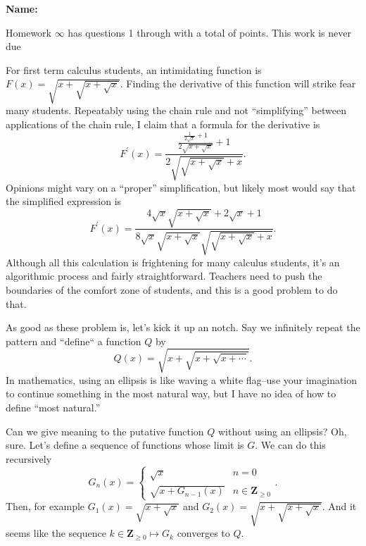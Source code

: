 \documentclass[12pt,fleqn,answers]{exam}
\newcommand{\integers}{\mathbf{Z}}
\newcommand{\quiz}{$\infty$}
\newcommand{\term}{Fall}
\begin{document}
\vspace{0.1in}
\noindent{}
{\bf Name:}  \\
\noindent \makebox[3.0truein][l]{\textbf{Homework \quiz, \term \/ \the\year}}
\vspace{0.1in}

\noindent  Homework \quiz\/  has questions 1 through  \numquestions \/ with a total 
of  \numpoints\/  points. 
This work is never due


\begin{questions}

 \question For first term calculus students, an intimidating function is $F(x) = \sqrt{x + \sqrt{x + \sqrt{x}}}$. Finding the derivative of 
 this function will strike fear many students. Repeatably using the chain rule and not ``simplifying'' between applications of the chain rule, 
  I claim that a formula for the derivative is
\begin{equation*}
F^\prime(x) = \frac{\frac{\frac{1}{2 \sqrt{x}}+1}{2 \sqrt{x+\sqrt{x}}}+1}{2 \sqrt{\sqrt{x+\sqrt{x}}+x}}.
\end{equation*}
Opinions might vary on a ``proper'' simplification, but likely most would say that the simplified expression is
\begin{equation*}
F^\prime(x) = \frac{4 \sqrt{x} \sqrt{x+\sqrt{x}}+2 \sqrt{x}+1}{8 \sqrt{x} \sqrt{x+\sqrt{x}} \sqrt{\sqrt{x+\sqrt{x}}+x}}.
  \end{equation*}
  Although all this calculation is frightening for many calculus students, it's an algorithmic process and fairly straightforward.  Teachers need to push
  the boundaries of the comfort zone of students, and this is a good problem to do that.
  
  
  \quad As good as these problem is, let's kick it up an notch.  Say we infinitely repeat the pattern and ``define`` a function $Q$ by
  \begin{equation*}
 Q(x) = \sqrt{x + \sqrt{x + \sqrt{x + \cdots}}}.
\end{equation*}
In mathematics, using an ellipsis is like waving a white flag--use your imagination to continue something in the most natural way, 
but I have no idea of how to define ``most natural.''  

\quad Can we give meaning to the putative function $Q$ without using an ellipsis?  Oh, sure.  Let's define a sequence of functions whose limit
is $G$.  We can do this recursively
\begin{equation*}
   G_{n}(x) = \begin{cases}  \sqrt{x}  & n = 0 \\ \sqrt{x + G_{n-1}(x)}  & n \in \integers_{\geq 0} \end{cases}.
\end{equation*}
Then, for example $G_1(x) = \sqrt{x+\sqrt{x}}$ and $G_2(x) = \sqrt{x+\sqrt{x + \sqrt{x}}}$.   And it seems like
the sequence $k \in \integers_{\geq 0} \mapsto G_k$ converges to $Q$.


\end{questions}
\end{document}
